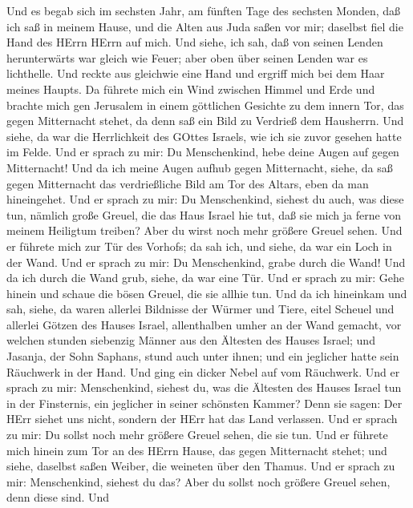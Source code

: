  Und es begab sich im sechsten Jahr, am fünften Tage des
sechsten Monden, daß ich saß in meinem Hause, und die Alten aus Juda
saßen vor mir; daselbst fiel die Hand des HErrn HErrn auf mich.
 Und siehe, ich sah, daß von seinen Lenden herunterwärts war
gleich wie Feuer; aber oben über seinen Lenden war es lichthelle.
 Und reckte aus gleichwie eine Hand und ergriff mich bei dem
Haar meines Haupts. Da führete mich ein Wind zwischen Himmel und Erde
und brachte mich gen Jerusalem in einem göttlichen Gesichte zu dem
innern Tor, das gegen Mitternacht stehet, da denn saß ein Bild zu
Verdrieß dem Hausherrn.  Und siehe, da war die Herrlichkeit
des GOttes Israels, wie ich sie zuvor gesehen hatte im Felde.
 Und er sprach zu mir: Du Menschenkind, hebe deine Augen auf
gegen Mitternacht! Und da ich meine Augen aufhub gegen Mitternacht,
siehe, da saß gegen Mitternacht das verdrießliche Bild am Tor des
Altars, eben da man hineingehet.  Und er sprach zu mir: Du
Menschenkind, siehest du auch, was diese tun, nämlich große Greuel, die
das Haus Israel hie tut, daß sie mich ja ferne von meinem Heiligtum
treiben? Aber du wirst noch mehr größere Greuel sehen.  Und
er führete mich zur Tür des Vorhofs; da sah ich, und siehe, da war ein
Loch in der Wand.  Und er sprach zu mir: Du Menschenkind,
grabe durch die Wand! Und da ich durch die Wand grub, siehe, da war eine
Tür.  Und er sprach zu mir: Gehe hinein und schaue die bösen
Greuel, die sie allhie tun.  Und da ich hineinkam und sah,
siehe, da waren allerlei Bildnisse der Würmer und Tiere, eitel Scheuel
und allerlei Götzen des Hauses Israel, allenthalben umher an der Wand
gemacht,  vor welchen stunden siebenzig Männer aus den
Ältesten des Hauses Israel; und Jasanja, der Sohn Saphans, stund auch
unter ihnen; und ein jeglicher hatte sein Räuchwerk in der Hand. Und
ging ein dicker Nebel auf vom Räuchwerk.  Und er sprach zu
mir: Menschenkind, siehest du, was die Ältesten des Hauses Israel tun in
der Finsternis, ein jeglicher in seiner schönsten Kammer? Denn sie
sagen: Der HErr siehet uns nicht, sondern der HErr hat das Land
verlassen.  Und er sprach zu mir: Du sollst noch mehr
größere Greuel sehen, die sie tun.  Und er führete mich
hinein zum Tor an des HErrn Hause, das gegen Mitternacht stehet; und
siehe, daselbst saßen Weiber, die weineten über den Thamus.
 Und er sprach zu mir: Menschenkind, siehest du das? Aber
du sollst noch größere Greuel sehen, denn diese sind.  Und

